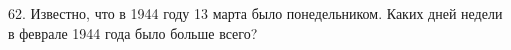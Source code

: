 62. Известно, что в 1944 году 13 марта было понедельником. Каких дней недели в феврале 1944 года было больше всего?\\
